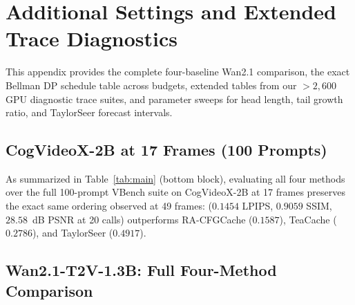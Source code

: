 \section{Additional Settings and Extended Trace Diagnostics}
\label{app:settings}

This appendix provides the complete four-baseline Wan2.1 comparison, the exact Bellman DP schedule table across budgets, extended tables from our $>2{,}600$ GPU diagnostic trace suites, and parameter sweeps for head length, tail growth ratio, and TaylorSeer forecast intervals.

\subsection{CogVideoX-2B at 17 Frames (100 Prompts)}
\label{app:cog17}
As summarized in Table~\ref{tab:main} (bottom block), evaluating all four methods over the full 100-prompt VBench suite on CogVideoX-2B at 17 frames preserves the exact same ordering observed at 49 frames: \method{} ($0.1454$ LPIPS, $0.9059$ SSIM, $28.58$~dB PSNR at 20 calls) outperforms RA-CFGCache ($0.1587$), TeaCache ($0.2786$), and TaylorSeer ($0.4917$).

\subsection{Wan2.1-T2V-1.3B: Full Four-Method Comparison}
\label{app:wanfull}

\begin{table}[ht]
\centering\footnotesize\setlength{\tabcolsep}{4.0pt}
\caption{\textbf{Wan2.1-T2V-1.3B (81 frames, 50 UniPC steps, 16 VBench prompts)} comparing all four methods in one harness. At $n=65$ and $n=100$ prompts (Table~\ref{tab:main}), \method{} likewise outperforms RA-CFGCache ($0.1469$ vs.\ $0.1716$ at $n=65$; $0.1527$ vs.\ $0.1685$ at $n=100$).}
\label{tab:wanfull}
\end{table}

